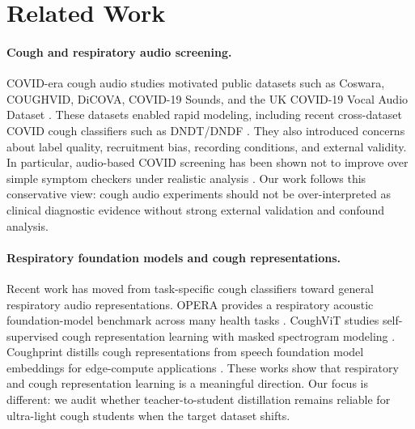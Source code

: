 \section{Related Work}

\paragraph{Cough and respiratory audio screening.}
COVID-era cough audio studies motivated public datasets such as Coswara, COUGHVID, DiCOVA, COVID-19 Sounds, and the UK COVID-19 Vocal Audio Dataset \cite{orlandic2021coughvid,bhattacharya2023coswara,dicova2021,han2022sounds,budd2024ukcovid}. These datasets enabled rapid modeling, including recent cross-dataset COVID cough classifiers such as DNDT/DNDF \cite{saravanan2026dndt}. They also introduced concerns about label quality, recruitment bias, recording conditions, and external validity. In particular, audio-based COVID screening has been shown not to improve over simple symptom checkers under realistic analysis \cite{coppock2024nmi}. Our work follows this conservative view: cough audio experiments should not be over-interpreted as clinical diagnostic evidence without strong external validation and confound analysis.

\paragraph{Respiratory foundation models and cough representations.}
Recent work has moved from task-specific cough classifiers toward general respiratory audio representations. OPERA provides a respiratory acoustic foundation-model benchmark across many health tasks \cite{opera2024}. CoughViT studies self-supervised cough representation learning with masked spectrogram modeling \cite{luong2025coughvit}. Coughprint distills cough representations from speech foundation model embeddings for edge-compute applications \cite{coughprint2025}. These works show that respiratory and cough representation learning is a meaningful direction. Our focus is different: we audit whether teacher-to-student distillation remains reliable for ultra-light cough students when the target dataset shifts.

